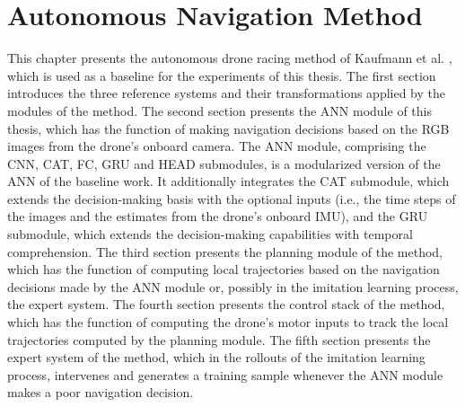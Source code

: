 \chapter{Autonomous Navigation Method}
\label{mainone}


This chapter presents 
the autonomous drone racing method of Kaufmann et al. \cite{Kaufmann2018},
which is used as a baseline for the experiments of this thesis.
The first section introduces the three reference systems 
and their transformations applied by the modules of the method.
The second section presents the ANN module of this thesis,
which has the function of making navigation decisions 
based on the RGB images from the drone's onboard camera.
The ANN module, comprising the CNN, CAT, FC, GRU and HEAD submodules,
is a modularized version of the ANN of the baseline work.
It additionally integrates the CAT submodule,
which extends the decision-making basis with the optional inputs
(i.e., the time steps of the images and 
the estimates from the drone's onboard IMU),
and the GRU submodule,
which extends the decision-making capabilities with temporal comprehension.
The third section presents the planning module of the method,
which has the function of computing local trajectories 
based on the navigation decisions made by
the ANN module or, possibly in the imitation learning process, the expert system.
The fourth section presents the control stack of the method,
which has the function of computing the drone's motor inputs 
to track the local trajectories computed by the planning module.
The fifth section presents the expert system of the method,
which in the rollouts of the imitation learning process,
intervenes and generates a training sample
whenever the ANN module makes a poor navigation decision.



